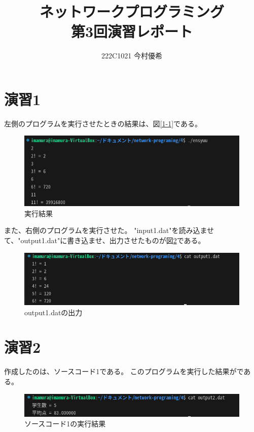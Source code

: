 \documentclass[documentclass]{jsarticle}
\begin{document}
\title{ネットワークプログラミング\\ 第3回演習レポート}
\author{222C1021 今村優希}
\maketitle

\newpage

\section*{演習1}
左側のプログラムを実行させたときの結果は、図\ref*{1-1}である。
\begin{figure}[H]
  \begin{center}
    \includegraphics*[scale=0.8]{figure/1-1.png}
  \end{center}
  \caption{実行結果}
  \label{fig:1-1}
\end{figure}
また、右側のプログラムを実行させた。
"input1.dat"を読み込ませて、"output1.dat"に書き込ませ、出力させたものが図\ref*{fig:1-2}である。
\begin{figure}[H]
  \begin{center}
    \includegraphics*[scale=0.8]{figure/1-2.png}
  \end{center}
  \caption{output1.datの出力}
  \label{fig:1-2}
\end{figure}

\section*{演習2}
作成したのは、ソースコード1である。
このプログラムを実行した結果がである。

\begin{figure}[H]
  \begin{center}
    \includegraphics*[scale=0.8]{figure/2-1.png}
  \end{center}
  \caption{ソースコード1の実行結果}
  \label{fig:2-1}
\end{figure}
\end{document}
